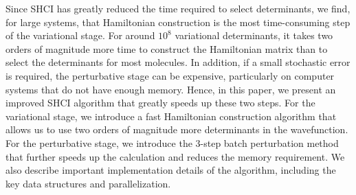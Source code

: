 \documentclass[%
reprint,
 superscriptaddress,
 amsmath,amssymb,
 aps,
]{revtex4-1}
\begin{document}
Since SHCI has greatly reduced the time required to select determinants, we find, for large systems, that Hamiltonian construction is the
most time-consuming step of the variational stage.
For around $10^8$ variational determinants, it takes two orders of magnitude more time to construct the Hamiltonian matrix than to select the determinants for most molecules.
In addition, if a small stochastic error is required, the perturbative stage can be expensive,
particularly on computer systems that do not have enough memory.
Hence, in this paper, we present an improved SHCI algorithm that greatly speeds up these two steps.
For the variational stage, we introduce a fast Hamiltonian construction algorithm that allows us to use two orders of magnitude more determinants in the wavefunction.
For the perturbative stage, we introduce the 3-step batch perturbation method that further speeds up the calculation and reduces
the memory requirement.
We also describe important implementation details of the algorithm, including the key data structures and parallelization.
\end{document}
